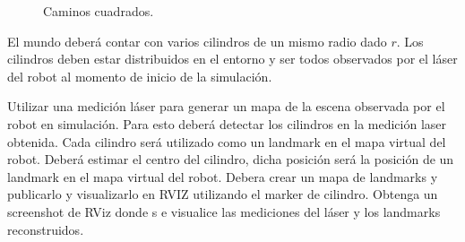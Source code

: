\documentclass[tp]{lcc}
\begin{document}
\begin{figure}[!htbp]
    \centering
    \hspace{3cm}
    \caption{Caminos cuadrados.}
    \label{fig:trajectories}
\end{figure}

\ejercicio El mundo deberá contar con varios cilindros de un mismo radio dado $r$. Los cilindros deben estar distribuidos en el entorno y ser todos observados por el láser del robot al momento de inicio de la simulación.

Utilizar una medición láser para generar un mapa de la escena observada por el robot en simulación. Para esto deberá detectar los cilindros en la medición laser obtenida. Cada cilindro será utilizado como un landmark en el mapa virtual del robot. Deberá estimar el centro del cilindro, dicha posición será la posición de un landmark en el mapa virtual del robot. Debera crear un mapa de landmarks y publicarlo y visualizarlo en RVIZ utilizando el marker de cilindro.
Obtenga un screenshot de RViz donde s
e visualice las mediciones del láser y los landmarks reconstruidos.


\printbibliography
\end{document}
